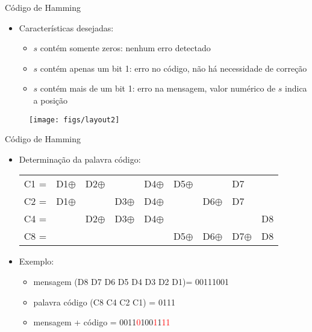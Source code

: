 \begin{slide}{Código de Hamming}
\begin{itemize}
   \item Características desejadas:\pause
   \begin{itemize}
      \item $s$ contém somente zeros: nenhum erro detectado\pause
      \item $s$ contém apenas um bit 1: erro no código, não há necessidade de correção\pause
      \item $s$ contém mais de um bit 1: erro na mensagem, valor numérico de $s$ indica a posição
   \end{itemize}
\end{itemize}
\begin{figure}[h]
         \centering
         \texttt{[image: figs/layout2]}
      \end{figure}
\end{slide}

\begin{slide}{Código de Hamming}
\begin{itemize}
   \item Determinação da palavra código:
   \begin{tabular}{l l l l l l l l l}
      C1 = &D1$\oplus$ &D2$\oplus$ &           &D4$\oplus$ &D5$\oplus$ &           &D7 &    \\
      C2 = &D1$\oplus$ &           &D3$\oplus$ &D4$\oplus$ &           &D6$\oplus$ &D7 &    \\
      C4 = &           &D2$\oplus$ &D3$\oplus$ &D4$\oplus$ &           &           & & D8 \\
      C8 = &           &           &           &           &D5$\oplus$ &D6$\oplus$ &D7$\oplus$ & D8 \\
   \end{tabular}
   \item Exemplo: 
   \begin{itemize}
      \item mensagem (D8 D7 D6 D5 D4 D3 D2 D1)= 00111001
      \item palavra código (C8 C4 C2 C1) = 0111
      \item mensagem + código = 0011\textcolor{red}{0}100\textcolor{red}{1}1\textcolor{red}{1}\textcolor{red}{1}
   \end{itemize}
\end{itemize}
\end{slide}

